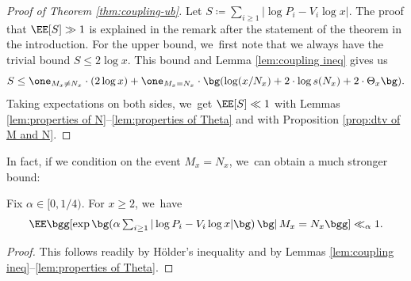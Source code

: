 \begin{proof}[Proof of Theorem \ref{thm:coupling-ub}]
Let $S \coloneqq \sum_{i \ge 1} |{\log P_i - V_i\log x}|$. The proof that $\EE[S] \gg 1$ is explained in the remark after the statement of the theorem in the introduction. For the upper bound, we~first note that we always have the trivial bound $S \le 2 \log x$. This bound and Lemma \ref{lem:coupling ineq} gives us
\[
S \le \one_{M_x \ne N_x}\cdot (2\log x) + \one_{M_x = N_x}\cdot \bg(\log(x/N_x) + 2\cdot \log s(N_x) + 2\cdot \Theta_x\bg).
\]
Taking expectations on both sides, we~get $\EE[S] \ll 1$ with Lemmas \ref{lem:properties of N}--\ref{lem:properties of Theta} and with Proposition \ref{prop:dtv of M and N}.
\end{proof}

In fact, if we condition on the event $M_x = N_x$, we~can obtain a much stronger bound:

\begin{prop}\label{thm:coupling-ub strong}
Fix $\alpha\in[0,1/4)$. For $x\ge2$, we~have
\[\textstyle
\EE\bgg[\exp\bg(\alpha \sum_{i \ge 1} |\log P_i - V_i \log x|\bg) \,\bg|\, M_x = N_x \bgg] \ll_{\alpha} 1.
\]
\end{prop}

\begin{proof}
This follows readily by Hölder's inequality and by Lemmas \ref{lem:coupling ineq}--\ref{lem:properties of Theta}.
\end{proof}

\label{sec:coupling:remarks}

